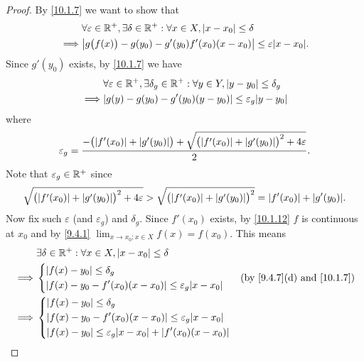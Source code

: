 \begin{proof}
  By \cref{10.1.7} we want to show that
  \begin{align*}
             & \forall \varepsilon \in \R^+, \exists \delta \in \R^+ : \forall x \in X, \abs{x - x_0} \leq \delta \\
    \implies & \abs{g\big(f(x)\big) - g(y_0) - g'(y_0) f'(x_0) (x - x_0)} \leq \varepsilon \abs{x - x_0}.
  \end{align*}
  Since \(g'(y_0)\) exists, by \cref{10.1.7} we have
  \begin{align*}
             & \forall \varepsilon \in \R^+, \exists \delta_g \in \R^+ : \forall y \in Y, \abs{y - y_0} \leq \delta_g \\
    \implies & \abs{g(y) - g(y_0) - g'(y_0) (y - y_0)} \leq \varepsilon_g \abs{y - y_0}
  \end{align*}
  where
  \[
    \varepsilon_g = \dfrac{-\big(\abs{f'(x_0)} + \abs{g'(y_0)}\big) + \sqrt{\big(\abs{f'(x_0)} + \abs{g'(y_0)}\big)^2 + 4 \varepsilon}}{2}.
  \]
  Note that \(\varepsilon_g \in \mathbb{R}^+\) since
  \[
    \sqrt{\big(\abs{f'(x_0)} + \abs{g'(y_0)}\big)^2 + 4 \varepsilon} > \sqrt{\big(\abs{f'(x_0)} + \abs{g'(y_0)}\big)^2} = \abs{f'(x_0)} + \abs{g'(y_0)}.
  \]
  Now fix such \(\varepsilon\) (and \(\varepsilon_g\)) and \(\delta_g\).
  Since \(f'(x_0)\) exists, by \cref{10.1.12} \(f\) is continuous at \(x_0\) and by \cref{9.4.1} \(\lim_{x \to x_0 ; x \in X} f(x) = f(x_0)\).
  This means
  \begin{align*}
             & \exists \delta \in \R^+ : \forall x \in X, \abs{x - x_0} \leq \delta                 \\
    \implies & \begin{dcases}
                 \abs{f(x) - y_0} \leq \delta_g \\
                 \abs{f(x) - y_0 - f'(x_0) (x - x_0)} \leq \varepsilon_g \abs{x - x_0}
               \end{dcases}                 &  & \text{(by \cref{9.4.7}(d) and \cref{10.1.7})}      \\
    \implies & \begin{dcases}
                 \abs{f(x) - y_0} \leq \delta_g                                        \\
                 \abs{f(x) - y_0 - f'(x_0) (x - x_0)} \leq \varepsilon_g \abs{x - x_0} \\
                 \abs{f(x) - y_0} \leq \varepsilon_g \abs{x - x_0} + \abs{f'(x_0) (x - x_0)}
               \end{dcases}           \\

\end{align*}
\end{proof}
